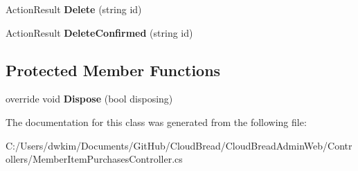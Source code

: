 \begin{DoxyCompactItemize}
\item 
Action\+Result {\bfseries Delete} (string id)\hypertarget{class_cloud_bread_admin_web_1_1_controllers_1_1_member_item_purchases_controller_ab8ba18ed303970ee91b53d609ab0c131}{}\label{class_cloud_bread_admin_web_1_1_controllers_1_1_member_item_purchases_controller_ab8ba18ed303970ee91b53d609ab0c131}

\item 
Action\+Result {\bfseries Delete\+Confirmed} (string id)\hypertarget{class_cloud_bread_admin_web_1_1_controllers_1_1_member_item_purchases_controller_a15ed8b16dd799c9d2d1b7d5e98846dcc}{}\label{class_cloud_bread_admin_web_1_1_controllers_1_1_member_item_purchases_controller_a15ed8b16dd799c9d2d1b7d5e98846dcc}

\end{DoxyCompactItemize}
\subsection*{Protected Member Functions}
\begin{DoxyCompactItemize}
\item 
override void {\bfseries Dispose} (bool disposing)\hypertarget{class_cloud_bread_admin_web_1_1_controllers_1_1_member_item_purchases_controller_a05712c8dbf18f1f823746e1a94fa70ec}{}\label{class_cloud_bread_admin_web_1_1_controllers_1_1_member_item_purchases_controller_a05712c8dbf18f1f823746e1a94fa70ec}

\end{DoxyCompactItemize}


The documentation for this class was generated from the following file\+:\begin{DoxyCompactItemize}
\item 
C\+:/\+Users/dwkim/\+Documents/\+Git\+Hub/\+Cloud\+Bread/\+Cloud\+Bread\+Admin\+Web/\+Controllers/Member\+Item\+Purchases\+Controller.\+cs\end{DoxyCompactItemize}
